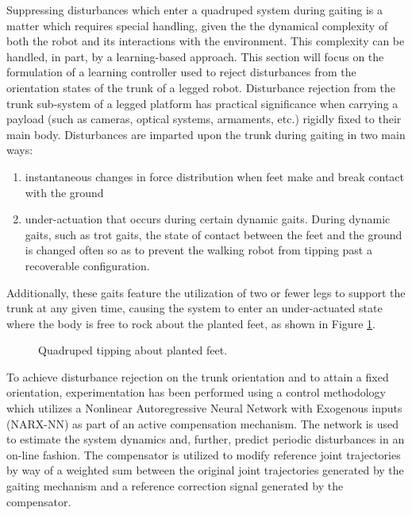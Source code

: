 		Suppressing disturbances which enter a quadruped system during gaiting is a matter which requires special handling, given the the dynamical complexity of both the robot and its interactions with the environment. This complexity can be handled, in part, by a learning-based approach. This section will focus on the formulation of a learning controller used to reject disturbances from the orientation states of the trunk of a legged robot. Disturbance rejection from the trunk sub-system of a legged platform has practical significance when carrying a payload (such as cameras, optical systems, armaments, etc.) rigidly fixed to their main body. Disturbances are imparted upon the trunk during gaiting in two main ways: 
		\begin{enumerate}
			\item instantaneous changes in force distribution when feet make and break contact with the ground 
			\item under-actuation that occurs during certain dynamic gaits. During dynamic gaits, such as trot gaits, the state of contact between the feet and the ground is changed often so as to prevent the walking robot from tipping past a recoverable configuration. 
			\end{enumerate}
		Additionally, these gaits feature the utilization of two or fewer legs to support the trunk at any given time, causing the system to enter an under-actuated state where the body is free to rock about the planted feet, as shown in Figure \ref{fig::quadruped_walking}.
			\begin{figure}[!h]
			\centering
				\caption{Quadruped tipping about planted feet.}
				\label{fig::quadruped_walking}
			\end{figure}
		To achieve disturbance rejection on the trunk orientation and to attain a fixed orientation, experimentation has been performed using a control methodology which utilizes a Nonlinear Autoregressive Neural Network with Exogenous inputs (NARX-NN) as part of an active compensation mechanism. The network is used to estimate the system dynamics and, further, predict periodic disturbances in an on-line fashion. The compensator is utilized to modify reference joint trajectories by way of a weighted sum between the original joint trajectories generated by the gaiting mechanism and a reference correction signal generated by the compensator.

